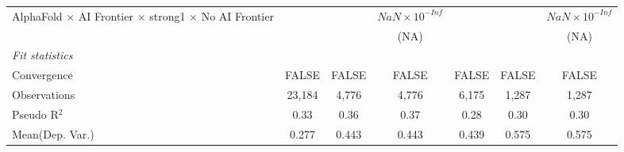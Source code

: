 \begin{tabular}{lcccccc}
   AlphaFold $\times$ AI Frontier $\times$ strong1 $\times$ No AI Frontier    &                        &                        & $NaN\times 10^{-Inf}$  &                        &                        & $NaN\times 10^{-Inf}$\\    
                                                                              &                        &                        & (NA)                   &                        &                        & (NA)\\   
   \midrule
   \emph{Fit statistics}\\
   Convergence                                                                &FALSE                   & FALSE                  & FALSE                  & FALSE                  & FALSE                  & FALSE\\  
   Observations                                                               & 23,184                 & 4,776                  & 4,776                  & 6,175                  & 1,287                  & 1,287\\  
   Pseudo R$^2$                                                               & 0.33                   & 0.36                   & 0.37                   & 0.28                   & 0.30                   & 0.30\\  
Mean(Dep. Var.) & 0.277 & 0.443 & 0.443 & 0.439 & 0.575 & 0.575 \\
   

\end{tabular}
